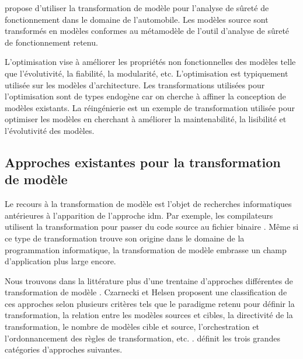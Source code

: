 \cite{biehl2010integrating} propose d'utiliser la transformation de modèle pour 
l'analyse de sûreté de fonctionnement dans le domaine de l'automobile. Les 
modèles source sont transformés en modèles conformes au métamodèle de l'outil 
d'analyse de sûreté de fonctionnement retenu.
 
L'optimisation vise à améliorer les propriétés non fonctionnelles des modèles 
telle que l'évolutivité, la fiabilité, la modularité, etc. L'optimisation est 
typiquement utilisée sur les modèles d'architecture. Les transformations 
utilisées pour l'optimisation sont de types endogène car on cherche à affiner 
la conception de modèles existants. La réingénierie est un exemple de 
transformation utilisée pour optimiser les modèles en cherchant à améliorer la 
maintenabilité, la lisibilité et l'évolutivité des modèles.


\subsection{Approches existantes pour la transformation de modèle}  
Le recours à la transformation de modèle est l'objet de recherches informatiques 
antérieures à l'apparition de l'approche \gls{idm}. Par exemple, les compilateurs 
utilisent la transformation pour passer du code source au fichier binaire 
\cite{aho1985compilers}. Même si ce type de transformation trouve son origine dans le domaine de 
la programmation informatique, la transformation de modèle embrasse un champ d'application 
plus large encore.

Nous trouvons dans la littérature plus d'une trentaine d'approches différentes 
de transformation de modèle \cite{syriani2011multi}. Czarnecki et Helsen 
proposent une classification de ces approches selon plusieurs critères tels que 
le paradigme retenu pour définir la transformation, la relation entre les 
modèles sources et cibles, la directivité de la transformation, le nombre de 
modèles cible et source, l'orchestration et l'ordonnancement des règles de 
transformation, etc. \cite{czarnecki2006feature}. \cite{blanc2011mda} définit les trois grandes catégories d'approches suivantes.

